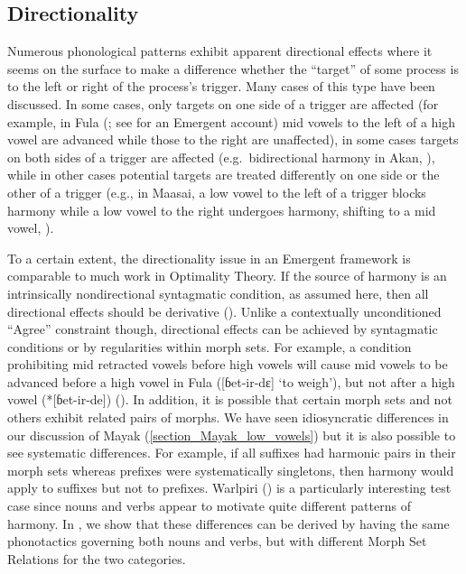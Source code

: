\subsection{Directionality}

Numerous phonological patterns exhibit apparent directional effects where it seems on the surface to make a difference whether the ``target'' of some process is to the left or right of the process's trigger. Many cases of this type have been discussed. In some cases, only targets on one side of a trigger are affected (for example, in Fula (\citealt{Paradis:1992, Archangeli+:1994}; see \citealt{Archangeli+:OUP} for an Emergent account) mid vowels to the left of a high vowel are advanced while those to the right are unaffected), in some cases targets on both sides of a trigger are affected (e.g.\ bidirectional harmony in Akan, \citealt{Clements:1985geometry}), while in other cases potential targets are treated differently on one side or the other of a trigger (e.g., in Maasai, a low vowel to the left of a trigger blocks harmony while a low vowel to the right undergoes harmony, shifting to a mid vowel, \citealt{Levergood:1984}). 

To a certain extent, the directionality issue in an Emergent framework is comparable to much work in Optimality Theory. If the source of harmony is an intrinsically nondirectional syntagmatic condition, as assumed here, then all directional effects should be derivative (\citealt{Bakovic:2000}). Unlike a contextually unconditioned ``Agree'' constraint though, directional effects can be achieved by  syntagmatic conditions or by regularities within morph sets. For example, a condition prohibiting mid retracted vowels before high vowels will cause mid vowels to be advanced before a high vowel in Fula ([ɓet-ir-dɛ] `to weigh'), but not after a high vowel (*[ɓet-ir-de]) (\citealt[87]{Paradis:1992}). In addition, it is possible that certain morph sets and not others exhibit related pairs of morphs. We have seen idiosyncratic differences in our discussion of Mayak (\Sec\ref{section_Mayak_low_vowels}) but it is also possible to see systematic differences. For example, if all suffixes had harmonic pairs in their morph sets whereas prefixes were systematically singletons, then harmony would apply to suffixes but not to prefixes. Warlpiri (\citealt{Nash:1980, Simpson:1983}) is a particularly interesting test case since nouns and verbs appear to motivate quite different patterns of harmony. In \citet{Archangeli+:Warlpiri}, we show that these differences can be derived by having the same phonotactics governing both nouns and verbs, but with different Morph Set Relations for the two categories.


